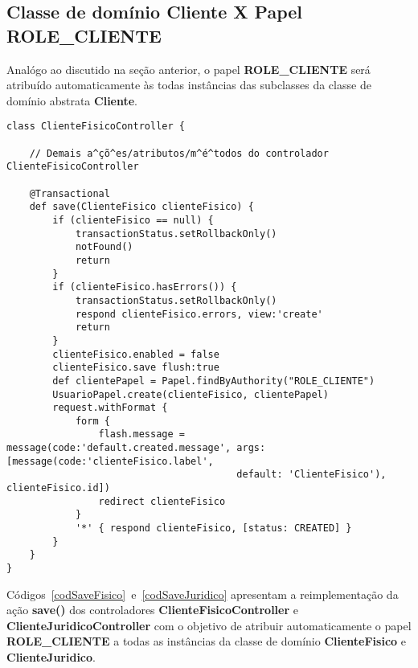 \newpage

\subsection{Classe de domínio Cliente X Papel {\bf ROLE\_CLIENTE}}

\vspace{0.5cm}

Analógo  ao  discutido na  seção  anterior,  o  papel {\bf  ROLE\_CLIENTE}  será
atribuído  automaticamente  às todas  instâncias  das  subclasses  da classe  de
domínio abstrata {\bf Cliente}.

\begin{lstlisting}[caption=Controlador {\bf  ClienteFisico} (ação {\bf save()}),
    frame=trBL, float=htbp, label=codSaveFisico] 
class ClienteFisicoController {

    // Demais a^çõ^es/atributos/m^é^todos do controlador ClienteFisicoController

    @Transactional
    def save(ClienteFisico clienteFisico) {
        if (clienteFisico == null) {
            transactionStatus.setRollbackOnly()
            notFound()
            return
        }
        if (clienteFisico.hasErrors()) {
            transactionStatus.setRollbackOnly()
            respond clienteFisico.errors, view:'create'
            return
        }
        clienteFisico.enabled = false       
        clienteFisico.save flush:true
        def clientePapel = Papel.findByAuthority("ROLE_CLIENTE")
        UsuarioPapel.create(clienteFisico, clientePapel)
        request.withFormat {
            form {
                flash.message = message(code:'default.created.message', args: [message(code:'clienteFisico.label', 
                                        default: 'ClienteFisico'), clienteFisico.id])
                redirect clienteFisico
            }
            '*' { respond clienteFisico, [status: CREATED] }
        }
    }
}
\end{lstlisting}


Códigos~\ref{codSaveFisico}~e~\ref{codSaveJuridico} apresentam a reimplementação
da  ação {\bf  save()} dos  controladores {\bf  ClienteFisicoController}  e {\bf
  ClienteJuridicoController} com o objetivo  de atribuir automaticamente o papel
{\bf  ROLE\_CLIENTE}   a  todas  as   instâncias  da  classe  de   domínio  {\bf
  ClienteFisico} e {\bf ClienteJuridico}.  

